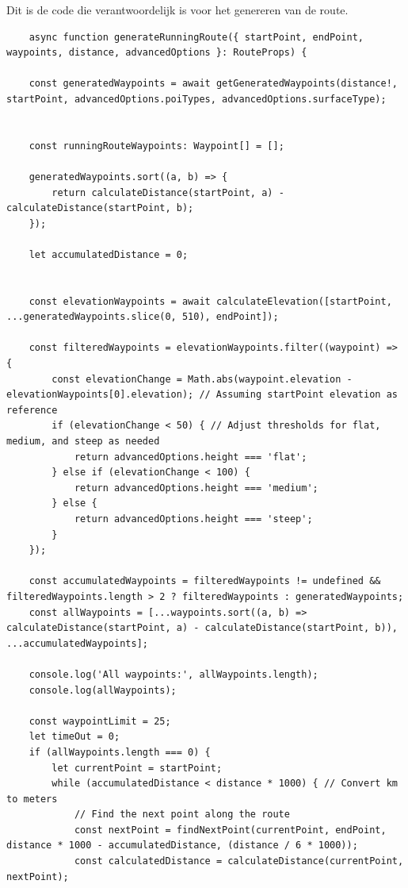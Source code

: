     \pagebreak

Dit is de code die verantwoordelijk is voor het genereren van de route.

\begin{lstlisting}
    async function generateRunningRoute({ startPoint, endPoint, waypoints, distance, advancedOptions }: RouteProps) {

    const generatedWaypoints = await getGeneratedWaypoints(distance!, startPoint, advancedOptions.poiTypes, advancedOptions.surfaceType);


    const runningRouteWaypoints: Waypoint[] = [];

    generatedWaypoints.sort((a, b) => {
        return calculateDistance(startPoint, a) - calculateDistance(startPoint, b);
    });

    let accumulatedDistance = 0;


    const elevationWaypoints = await calculateElevation([startPoint, ...generatedWaypoints.slice(0, 510), endPoint]);

    const filteredWaypoints = elevationWaypoints.filter((waypoint) => {
        const elevationChange = Math.abs(waypoint.elevation - elevationWaypoints[0].elevation); // Assuming startPoint elevation as reference
        if (elevationChange < 50) { // Adjust thresholds for flat, medium, and steep as needed
            return advancedOptions.height === 'flat';
        } else if (elevationChange < 100) {
            return advancedOptions.height === 'medium';
        } else {
            return advancedOptions.height === 'steep';
        }
    });

    const accumulatedWaypoints = filteredWaypoints != undefined && filteredWaypoints.length > 2 ? filteredWaypoints : generatedWaypoints;
    const allWaypoints = [...waypoints.sort((a, b) => calculateDistance(startPoint, a) - calculateDistance(startPoint, b)), ...accumulatedWaypoints];
    
    console.log('All waypoints:', allWaypoints.length);
    console.log(allWaypoints);
    
    const waypointLimit = 25;
    let timeOut = 0;
    if (allWaypoints.length === 0) {
        let currentPoint = startPoint;
        while (accumulatedDistance < distance * 1000) { // Convert km to meters
            // Find the next point along the route
            const nextPoint = findNextPoint(currentPoint, endPoint, distance * 1000 - accumulatedDistance, (distance / 6 * 1000));
            const calculatedDistance = calculateDistance(currentPoint, nextPoint);


\end{lstlisting}
